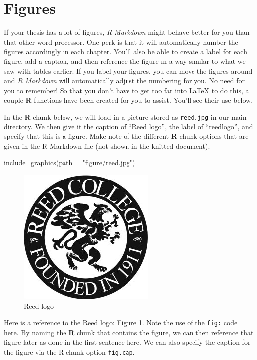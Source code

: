 \documentclass[12pt,twoside]{reedthesis}
\newenvironment{Shaded}{\begin{snugshade}}{\end{snugshade}}
\newcommand{\AttributeTok}[1]{\textcolor[rgb]{0.77,0.63,0.00}{#1}}
\newcommand{\FunctionTok}[1]{\textcolor[rgb]{0.00,0.00,0.00}{#1}}
\newcommand{\NormalTok}[1]{#1}
\newcommand{\StringTok}[1]{\textcolor[rgb]{0.31,0.60,0.02}{#1}}
\begin{document}
\hypertarget{figures}{%
\section{Figures}\label{figures}}

If your thesis has a lot of figures, \emph{R Markdown} might behave better for you than that other word processor. One perk is that it will automatically number the figures accordingly in each chapter. You'll also be able to create a label for each figure, add a caption, and then reference the figure in a way similar to what we saw with tables earlier. If you label your figures, you can move the figures around and \emph{R Markdown} will automatically adjust the numbering for you. No need for you to remember! So that you don't have to get too far into LaTeX to do this, a couple \textbf{R} functions have been created for you to assist. You'll see their use below.

In the \textbf{R} chunk below, we will load in a picture stored as \texttt{reed.jpg} in our main directory. We then give it the caption of ``Reed logo'', the label of ``reedlogo'', and specify that this is a figure. Make note of the different \textbf{R} chunk options that are given in the R Markdown file (not shown in the knitted document).
\begin{Shaded}
\begin{Highlighting}[]
\FunctionTok{include\_graphics}\NormalTok{(}\AttributeTok{path =} \StringTok{"figure/reed.jpg"}\NormalTok{)}
\end{Highlighting}
\end{Shaded}
\begin{figure}

{\centering \includegraphics[width=0.2\linewidth]{figure/reed} 

}

\caption{Reed logo}\label{fig:reedlogo}
\end{figure}
Here is a reference to the Reed logo: Figure \ref{fig:reedlogo}. Note the use of the \texttt{fig:} code here. By naming the \textbf{R} chunk that contains the figure, we can then reference that figure later as done in the first sentence here. We can also specify the caption for the figure via the R chunk option \texttt{fig.cap}.
\end{document}
